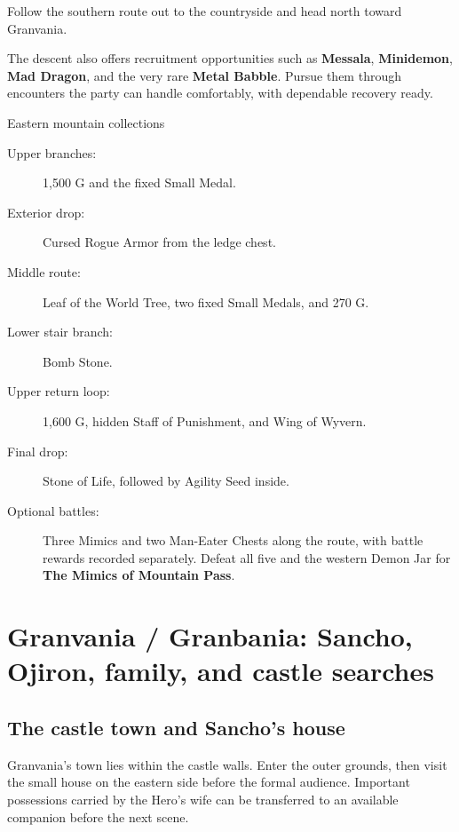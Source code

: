 Follow
the southern route out to the countryside and head north toward
Granvania.

The descent also offers recruitment opportunities such as
\textbf{Messala}, \textbf{Minidemon}, \textbf{Mad Dragon}, and
the very rare \textbf{Metal Babble}. Pursue them through encounters
the party can handle comfortably, with dependable recovery ready.


\begin{routecheck}{Eastern mountain collections}
\begin{description}
  \item[Upper branches:] 1,500 G and the fixed Small Medal.
  \item[Exterior drop:] Cursed Rogue Armor from the ledge chest.
  \item[Middle route:] Leaf of the World Tree, two fixed Small Medals,
    and 270 G.
  \item[Lower stair branch:] Bomb Stone.
  \item[Upper return loop:] 1,600 G, hidden Staff of Punishment,
    and Wing of Wyvern.
  \item[Final drop:] Stone of Life, followed by Agility Seed inside.
  \item[Optional battles:] Three Mimics and two Man-Eater Chests
    along the route, with battle rewards recorded separately. Defeat all
    five and the western Demon Jar for \textbf{The Mimics of Mountain Pass}.
\end{description}
\end{routecheck}

\section{Granvania / Granbania: Sancho, Ojiron, family, and castle searches}

\subsection*{The castle town and Sancho's house}

Granvania's town lies within the castle walls. Enter the outer grounds,
then visit the small house on the eastern side before the formal
audience. Important possessions carried by the Hero's wife can be
transferred to an available companion before the next scene.

